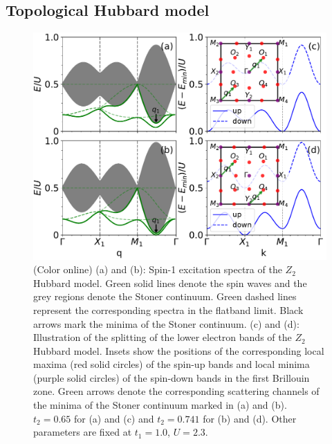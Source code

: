 \documentclass[amsmath,superscriptaddress,showpacs,aps,prb,twocolumn]{revtex4-1}
\begin{document}
\subsection{Topological Hubbard model}
\begin{figure}
\includegraphics[width=\columnwidth]{tispectrum}
\caption{(Color online) (a) and (b): Spin-1 excitation spectra of the $Z_2$ Hubbard model. Green solid lines denote the spin waves and the grey regions denote the Stoner continuum. Green dashed lines represent the corresponding spectra in the flatband limit. Black arrows mark the minima of the Stoner continuum. (c) and (d): Illustration of the splitting of the lower electron bands of the $Z_2$ Hubbard model. Insets show the positions of the corresponding local maxima (red solid circles) of the spin-up bands and local minima (purple solid circles) of the spin-down bands in the first Brillouin zone. Green arrows denote the corresponding scattering channels of the minima of the Stoner continuum marked in (a) and (b). $t_2=0.65$ for (a) and (c) and $t_2=0.741$ for (b) and (d). Other parameters are fixed at $t_1=1.0$, $U=2.3$.}
\label{tispectrum}
\end{figure}

\end{document}
